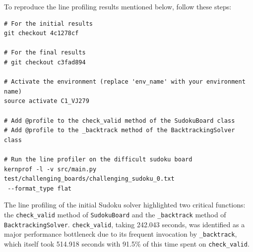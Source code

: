 \documentclass[11pt]{article}
\begin{document}
\begin{itemize}
To reproduce the line profiling results mentioned below, follow these steps:

\begin{verbatim}
# For the initial results 
git checkout 4c1278cf

# For the final results
# git checkout c3fad894

# Activate the environment (replace 'env_name' with your environment name)
source activate C1_VJ279

# Add @profile to the check_valid method of the SudokuBoard class
# Add @profile to the _backtrack method of the BacktrackingSolver class

# Run the line profiler on the difficult sudoku board
kernprof -l -v src/main.py test/challenging_boards/challenging_sudoku_0.txt
 --format_type flat
\end{verbatim}


The line profiling of the initial Sudoku solver highlighted two critical functions: the \texttt{check\_valid} method of \texttt{SudokuBoard} and the \texttt{\_backtrack} method of \texttt{BacktrackingSolver}. \texttt{check\_valid}, taking 242.043 seconds, was identified as a major performance bottleneck due to its frequent invocation by \texttt{\_backtrack}, which itself took 514.918 seconds with 91.5\% of this time spent on \texttt{check\_valid}. 


\end{itemize}
\end{document}
